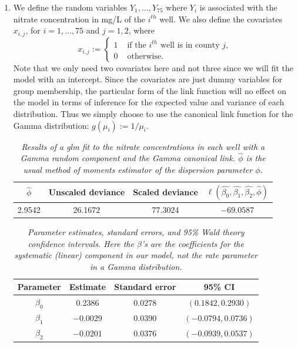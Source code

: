 \documentclass[12pt]{article}
\begin{document}
\newpage

\begin{enumerate}
  \item We define the random variables $Y_{1}, \dots, Y_{75}$ where $Y_{i}$ is associated with the nitrate concentration in mg/L of the $i^{th}$ well.
    We also define the covariates $x_{i,j}$, for $i = 1,
    \hdots, 75$ and $j = 1,2$, where
    \[
      x_{i,j} := \left\{ \begin{array}{cl}
          1 & \text{ if the $i^{th}$ well is in county $j$,} \\
          0 & \text{ otherwise}.
      \end{array} \right.
    \]
    Note that we only need two covariates here and not three since we will fit the model with an intercept.
    Since the covariates are just dummy variables for group membership, the particular form of the link function will no effect on the model in terms
    of inference for the expected value and variance of each distribution.
    Thus we simply choose to use the canonical link function for the Gamma distribution: $g(\mu_i) := 1 / \mu_i$.
    

    \begin{table}[h]
      \caption{\emph{Results of a glm fit to the nitrate concentrations in each well with a Gamma random component and the Gamma canonical link.
      $\hat{\phi}$ is the usual method of moments estimator of the dispersion parameter $\phi$.}}
      \vspace{.2cm}
      \centering
      \begin{tabular}{|c|c|c|c|}
        \hline
        $\hat{\phi}$ & Unscaled deviance & Scaled deviance & $\ell(\hat{\beta_0}, \hat{\beta_1}, \hat{\beta_2}, \hat{\phi})$ \\
        \hline
        2.9542 & 26.1672 & 77.3024 & $-69.0587$ \\
        \hline
      \end{tabular}
      \label{tab:1}
    \end{table}


    \begin{table}[h]
      \caption{\emph{Parameter estimates, standard errors, and 95\% Wald theory confidence intervals. Here the $\beta$'s are the coefficients for the
      systematic (linear) component in our model, not the rate parameter in a Gamma distribution.}}
      \vspace{.2cm}
      \centering
      \begin{tabular}{|c|c|c|c|}
        \hline
        Parameter & Estimate & Standard error & 95\% CI \\
        \hline
        $\beta_0$ & 0.2386 & 0.0278 & $(0.1842,0.2930)$ \\
        \hline
        $\beta_1$ & $-0.0029$ & 0.0390 & $(-0.0794, 0.0736)$ \\
        \hline
        $\beta_2$ & $-0.0201$ & 0.0376 & $(-0.0939, 0.0537)$ \\
        \hline
      \end{tabular}
      \label{tab:2}
    \end{table}


\end{enumerate}
\end{document}
